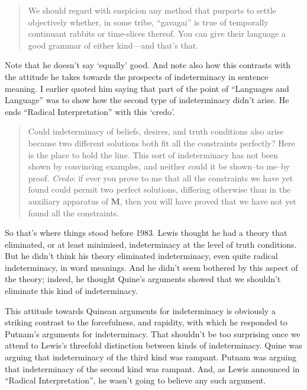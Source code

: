 \begin{quote}
We should regard with suspicion any method that purports to settle objectively whether, in some tribe, ``gavagai'' is true of temporally continuant rabbits or time-slices thereof. You can give their language a good grammar of either kind---and that's that. \citep[177]{Lewis1975b}
\end{quote}

\noindent Note that he doesn't say `equally' good. And note also how this contrasts with the attitude he takes towards the prospects of indeterminacy in sentence meaning. I earlier quoted him saying that part of the point of ``Languages and Language'' was to show how the second type of indeterminacy didn't arise. He ends ``Radical Interpretation'' with this `credo'.

\begin{quote}
Could indeterminacy of beliefs, desires, and truth conditions also arise because two different solutions both fit all the constraints perfectly? Here is the place to hold the line. This sort of indeterminacy has not been shown by convincing examples, and neither could it be shown--to me--by proof. \textit{Credo}: if ever you prove to me that all the constraints we have yet found could permit two perfect solutions, differing otherwise than in the auxiliary apparatus of \textbf{M}, then you will have proved that we have not yet found all the constraints. \citep[343]{Lewis1974c}
\end{quote}

\noindent So that's where things stood before 1983. Lewis thought he had a theory that eliminated, or at least minimised, indeterminacy at the level of truth conditions. But he didn't think his theory eliminated indeterminacy, even quite radical indeterminacy, in word meanings. And he didn't seem bothered by this aspect of the theory; indeed, he thought Quine's arguments showed that we shouldn't eliminate this kind of indeterminacy.

This attitude towards Quinean arguments for indeterminacy is obviously a striking contrast to the forcefulness, and rapidity, with which he responded to Putnam's arguments for indeterminacy. That shouldn't be too surprising once we attend to Lewis's threefold distinction between kinds of indeterminacy. Quine was arguing that indeterminacy of the third kind was rampant. Putnam was arguing that indeterminacy of the second kind was rampant. And, as Lewis announced in ``Radical Interpretation'', he wasn't going to believe any such argument.

